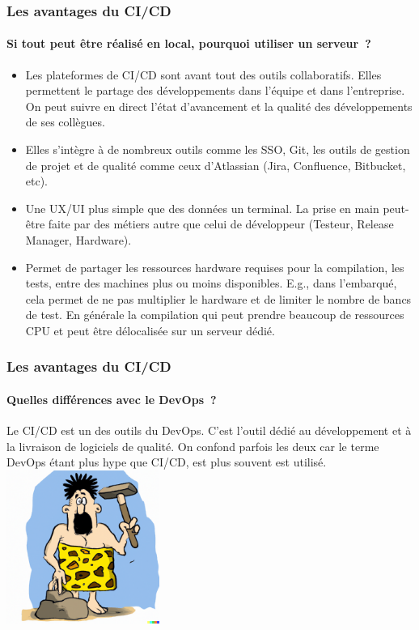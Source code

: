 \documentclass{beamer}
\begin{document}
    \begin{frame}
        \frametitle{Les avantages du CI/CD}
        \framesubtitle{Si tout peut être réalisé en local, pourquoi utiliser un serveur~?}
        \transdissolve
        \begin{itemize}
            \item Les plateformes de CI/CD sont avant tout des outils collaboratifs.
            Elles permettent le partage des développements dans l'équipe et dans l'entreprise.
            On peut suivre en direct l'état d'avancement et la qualité des développements de ses collègues.
            \item Elles s'intègre à de nombreux outils comme les SSO, Git, les outils de gestion de projet et de qualité comme ceux d'Atlassian (Jira, Confluence, Bitbucket, etc).
            \item Une UX/UI plus simple que des données un terminal.
            La prise en main peut-être faite par des métiers autre que celui de développeur (Testeur, Release Manager, Hardware).
            \item Permet de partager les ressources hardware requises pour la compilation, les tests, entre des machines plus ou moins disponibles.
            E.g., dans l'embarqué, cela permet de ne pas multiplier le hardware et de limiter le nombre de bancs de test.
            En générale la compilation qui peut prendre beaucoup de ressources CPU et peut être délocalisée sur un serveur dédié.
        \end{itemize}
    \end{frame}

    \begin{frame}
        \frametitle{Les avantages du CI/CD}
        \framesubtitle{Quelles différences avec le DevOps~?}
        \transdissolve
        Le CI/CD est un des outils du DevOps.
        \bigbreak
        C'est l'outil dédié au développement et à la livraison de logiciels de qualité.
        On confond parfois les deux car le terme DevOps étant plus hype que CI/CD, est plus souvent est utilisé.
        \bigbreak
        \centering
        \includegraphics[width=5cm]{image/caveman-using-a-sophisticated-tool.png}
    \end{frame}
\end{document}
